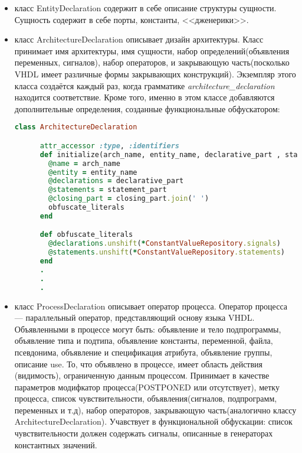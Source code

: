 \begin{itemize}
\begin{lstlisting}[language=Ruby, style=rubystyle,caption={Добавление дополнительных компонентов для функциональной обфускации}, label=lst:arch_and_mod:design_functional_obf]
      (@statements.select {|s| s.class.name == 'EntityDeclaration'}[0].header = [generic_clause,header].flatten) if append_to_header
    end
  \end{lstlisting}
\item класс EntityDeclaration содержит в себе описание структуры сущности. Сущность содержит в себе порты, константы, <<дженерики>>.
\item класс ArchitectureDeclaration описывает дизайн архитектуры. Класс принимает имя архитектуры, имя сущности, набор определений(объявления переменных, сигналов), набор операторов, и закрывающую часть(посколько VHDL имеет различные формы закрывающих конструкций). Экземпляр этого класса создаётся каждый раз, когда грамматике \textit{architecture\_declaration} находится соответствие. Кроме того, именно в этом классе добавляются дополнительные определения, созданные функциональные обфускатором:
  \begin{lstlisting}[language=Ruby, style=rubystyle,caption={Часть кода, отвечающая за функциональную обфускацию}, label=lst:arch_and_mod:declaration_functional_obf]
    class ArchitectureDeclaration

      attr_accessor :type, :identifiers
      def initialize(arch_name, entity_name, declarative_part , statement_part, closing_part)
        @name = arch_name
        @entity = entity_name
        @declarations = declarative_part
        @statements = statement_part
        @closing_part = closing_part.join(' ')
        obfuscate_literals
      end

      def obfuscate_literals
        @declarations.unshift(*ConstantValueRepository.signals)
        @statements.unshift(*ConstantValueRepository.statements)
      end
      .
      .
      .
  \end{lstlisting}
\item класс ProcessDeclaration описывает оператор процесса. Оператор процесса --- параллельный оператор, представляющий основу языка VHDL. Объявленными в процессе могут быть: объявление и тело подпрограммы, объявление типа и подтипа, объявление константы, переменной, файла, псевдонима, объявление и спецификация атрибута, объявление группы, описание use. То, что объявлено в процессе, имеет область действия (видимость), ограниченную данным процессом. Принимает в качестве параметров модифкатор процесса(POSTPONED или отсутствует), метку процесса, список чувствительности, объявления(сигналов, подпрограмм, переменных и т.д), набор операторов, закрывающую часть(аналогично классу \\ArchitectureDeclaration). Учавствует в функциональной обфускации: список чувствительности должен содержать сигналы, описанные в генераторах константных значений.
\end{itemize}

